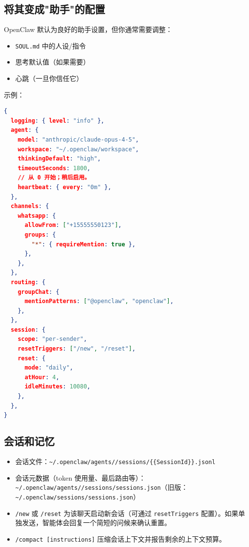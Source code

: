 \subsection{将其变成"助手"的配置}


OpenClaw 默认为良好的助手设置，但你通常需要调整：

\begin{itemize}
  \item \texttt{SOUL.md} 中的人设/指令
  \item 思考默认值（如果需要）
  \item 心跳（一旦你信任它）
\end{itemize}


示例：

\begin{lstlisting}[language=json]
{
  logging: { level: "info" },
  agent: {
    model: "anthropic/claude-opus-4-5",
    workspace: "~/.openclaw/workspace",
    thinkingDefault: "high",
    timeoutSeconds: 1800,
    // 从 0 开始；稍后启用。
    heartbeat: { every: "0m" },
  },
  channels: {
    whatsapp: {
      allowFrom: ["+15555550123"],
      groups: {
        "*": { requireMention: true },
      },
    },
  },
  routing: {
    groupChat: {
      mentionPatterns: ["@openclaw", "openclaw"],
    },
  },
  session: {
    scope: "per-sender",
    resetTriggers: ["/new", "/reset"],
    reset: {
      mode: "daily",
      atHour: 4,
      idleMinutes: 10080,
    },
  },
}
\end{lstlisting}


\subsection{会话和记忆}


\begin{itemize}
  \item 会话文件：\texttt{\textasciitilde{}/.openclaw/agents//sessions/\{\{SessionId\}\}.jsonl}
  \item 会话元数据（token 使用量、最后路由等）：\texttt{\textasciitilde{}/.openclaw/agents//sessions/sessions.json}（旧版：\texttt{\textasciitilde{}/.openclaw/sessions/sessions.json}）
  \item \texttt{/new} 或 \texttt{/reset} 为该聊天启动新会话（可通过 \texttt{resetTriggers} 配置）。如果单独发送，智能体会回复一个简短的问候来确认重置。
  \item \texttt{/compact [instructions]} 压缩会话上下文并报告剩余的上下文预算。
\end{itemize}


